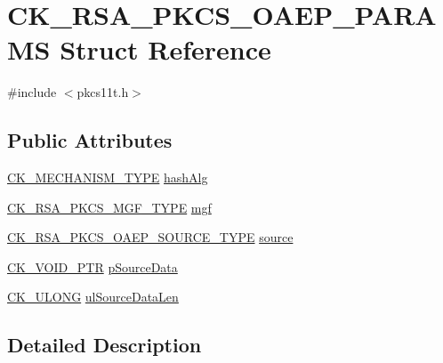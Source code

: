 \hypertarget{struct_c_k___r_s_a___p_k_c_s___o_a_e_p___p_a_r_a_m_s}{}\section{C\+K\+\_\+\+R\+S\+A\+\_\+\+P\+K\+C\+S\+\_\+\+O\+A\+E\+P\+\_\+\+P\+A\+R\+A\+MS Struct Reference}
\label{struct_c_k___r_s_a___p_k_c_s___o_a_e_p___p_a_r_a_m_s}


{\ttfamily \#include $<$pkcs11t.\+h$>$}

\subsection*{Public Attributes}
\begin{DoxyCompactItemize}
\item 
\hyperlink{pkcs11t_8h_aaf1084907f5cc09a3e0b85ab022a240d}{C\+K\+\_\+\+M\+E\+C\+H\+A\+N\+I\+S\+M\+\_\+\+T\+Y\+PE} \hyperlink{struct_c_k___r_s_a___p_k_c_s___o_a_e_p___p_a_r_a_m_s_a830f53e5a9c6b02bacaf1de3f18355ad}{hash\+Alg}
\item 
\hyperlink{pkcs11t_8h_a85bafbc5ca956ad99bbc6068334a98e6}{C\+K\+\_\+\+R\+S\+A\+\_\+\+P\+K\+C\+S\+\_\+\+M\+G\+F\+\_\+\+T\+Y\+PE} \hyperlink{struct_c_k___r_s_a___p_k_c_s___o_a_e_p___p_a_r_a_m_s_ad315447d7714ea28f1a920a4b65c0c22}{mgf}
\item 
\hyperlink{pkcs11t_8h_a0e26418b93b795f116f4477d6c155faf}{C\+K\+\_\+\+R\+S\+A\+\_\+\+P\+K\+C\+S\+\_\+\+O\+A\+E\+P\+\_\+\+S\+O\+U\+R\+C\+E\+\_\+\+T\+Y\+PE} \hyperlink{struct_c_k___r_s_a___p_k_c_s___o_a_e_p___p_a_r_a_m_s_a9e3d19a611b80dd8e9c20d94428d90eb}{source}
\item 
\hyperlink{pkcs11t_8h_ace49359127edfc5665608140005b9a96}{C\+K\+\_\+\+V\+O\+I\+D\+\_\+\+P\+TR} \hyperlink{struct_c_k___r_s_a___p_k_c_s___o_a_e_p___p_a_r_a_m_s_adcf064c32570d5a83461f6bdee278f87}{p\+Source\+Data}
\item 
\hyperlink{pkcs11t_8h_a35181858a3b7a0a81f49d180d8f446ef}{C\+K\+\_\+\+U\+L\+O\+NG} \hyperlink{struct_c_k___r_s_a___p_k_c_s___o_a_e_p___p_a_r_a_m_s_ad292b329d2fa340bb1523547addcd9ec}{ul\+Source\+Data\+Len}
\end{DoxyCompactItemize}


\subsection{Detailed Description}


